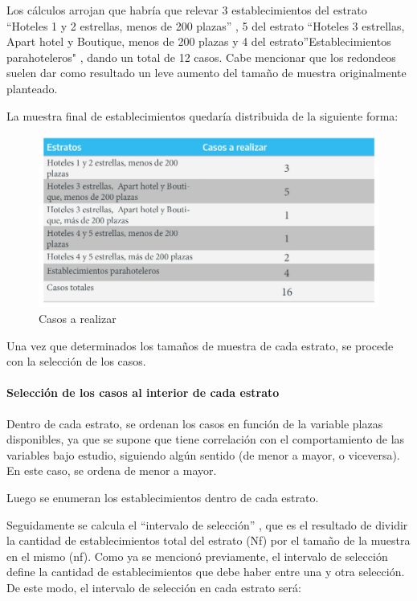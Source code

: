 \documentclass[
]{book}
\begin{document}
Los cálculos arrojan que habría que relevar 3 establecimientos del estrato ``Hoteles 1 y 2 estrellas, menos de 200 plazas'' , 5 del estrato ``Hoteles 3 estrellas, Apart hotel y Boutique, menos de 200 plazas y 4 del estrato''Establecimientos parahoteleros" , dando un total de 12 casos. Cabe mencionar que los redondeos suelen dar como resultado un leve aumento del tamaño de muestra originalmente planteado.

La muestra final de establecimientos quedaría distribuida de la siguiente forma:

\begin{figure}

{\centering \includegraphics[width=1\linewidth]{imagenes/tabla_2C} 

}

\caption{Casos a realizar}\label{fig:casos-a-realizar}
\end{figure}

Una vez que determinados los tamaños de muestra de cada estrato, se procede con la selección de los casos.

\hypertarget{selecciuxf3n-de-los-casos-al-interior-de-cada-estrato}{%
\paragraph{Selección de los casos al interior de cada estrato}\label{selecciuxf3n-de-los-casos-al-interior-de-cada-estrato}}

Dentro de cada estrato, se ordenan los casos en función de la variable plazas disponibles, ya que se supone que tiene correlación con el comportamiento de las variables bajo estudio, siguiendo algún sentido (de menor a mayor, o viceversa). En este caso, se ordena de menor a mayor.

Luego se enumeran los establecimientos dentro de cada estrato.

Seguidamente se calcula el ``intervalo de selección'' , que es el resultado de dividir la cantidad de establecimientos total del estrato (Nf) por el tamaño de la muestra en el mismo (nf). Como ya se mencionó previamente, el intervalo de selección define la cantidad de establecimientos que debe haber entre una y otra selección. De este modo, el intervalo de selección en cada estrato será:
\end{document}

